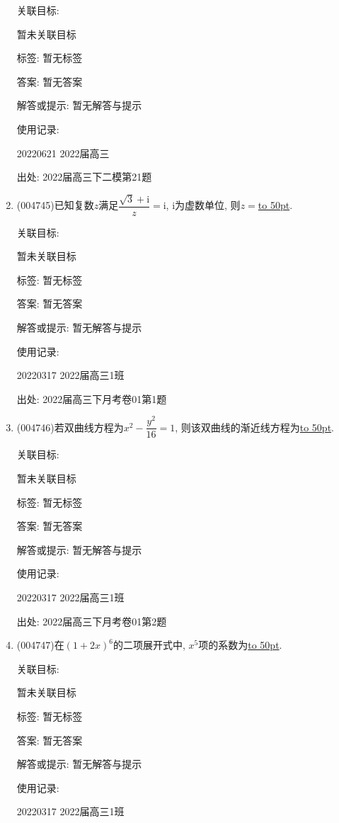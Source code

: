 \documentclass[10pt,a4paper]{article}
\newcommand{\blank}[1]{\underline{\hbox to #1pt{}}}
\begin{document}
\begin{enumerate}[1.]
关联目标:

暂未关联目标



标签: 暂无标签

答案: 暂无答案

解答或提示: 暂无解答与提示

使用记录:

20220621	2022届高三			


出处: 2022届高三下二模第21题
\item { (004745)}已知复数$z$满足$\dfrac{\sqrt 3+\mathrm{i}}z=\mathrm{i}$, $\mathrm{i}$为虚数单位, 则$z=$\blank{50}.


关联目标:

暂未关联目标



标签: 暂无标签

答案: 暂无答案

解答或提示: 暂无解答与提示

使用记录:

20220317	2022届高三1班	


出处: 2022届高三下月考卷01第1题
\item { (004746)}若双曲线方程为${x^2}-\dfrac{y^2}{16}=1$, 则该双曲线的渐近线方程为\blank{50}.


关联目标:

暂未关联目标



标签: 暂无标签

答案: 暂无答案

解答或提示: 暂无解答与提示

使用记录:

20220317	2022届高三1班	


出处: 2022届高三下月考卷01第2题
\item { (004747)}在$(1+2x)^6$的二项展开式中, $x^5$项的系数为\blank{50}.


关联目标:

暂未关联目标



标签: 暂无标签

答案: 暂无答案

解答或提示: 暂无解答与提示

使用记录:

20220317	2022届高三1班	



\end{enumerate}
\end{document}
